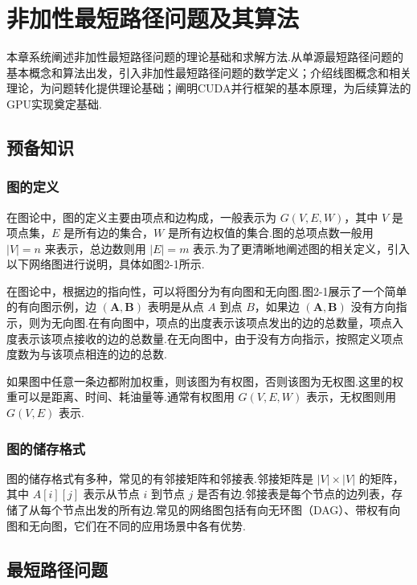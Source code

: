 
\chapter{非加性最短路径问题及其算法}

本章系统阐述非加性最短路径问题的理论基础和求解方法.从单源最短路径问题的基本概念和算法出发，引入非加性最短路径问题的数学定义；介绍线图概念和相关理论，为问题转化提供理论基础；阐明CUDA并行框架的基本原理，为后续算法的GPU实现奠定基础.

\section{预备知识}


\subsection{图的定义}

在图论中，图的定义主要由项点和边构成，一般表示为 $G(V, E, W)$，其中 $V$ 是项点集，$E$ 是所有边的集合，$W$ 是所有边权值的集合.图的总项点数一般用 $|V|=n$ 来表示，总边数则用 $|E|=m$ 表示.为了更清晰地阐述图的相关定义，引入以下网络图进行说明，具体如图2-1所示.

在图论中，根据边的指向性，可以将图分为有向图和无向图.图2-1展示了一个简单的有向图示例，边 $(\mathbf{A}, \mathbf{B})$ 表明是从点 $A$ 到点 $B$，如果边 $(\mathbf{A}, \mathbf{B})$ 没有方向指示，则为无向图.在有向图中，项点的出度表示该项点发出的边的总数量，项点入度表示该项点接收的边的总数量.在无向图中，由于没有方向指示，按照定义项点度数为与该项点相连的边的总数.

如果图中任意一条边都附加权重，则该图为有权图，否则该图为无权图.这里的权重可以是距离、时间、耗油量等.通常有权图用 $G(V, E, W)$ 表示，无权图则用 $G(V, E)$ 表示.

\subsection{图的储存格式}

图的储存格式有多种，常见的有邻接矩阵和邻接表.邻接矩阵是 \( |V| \times |V| \) 的矩阵，其中 \( A[i][j] \) 表示从节点 \( i \) 到节点 \( j \) 是否有边.邻接表是每个节点的边列表，存储了从每个节点出发的所有边.常见的网络图包括有向无环图（DAG）、带权有向图和无向图，它们在不同的应用场景中各有优势.

\section{最短路径问题}

